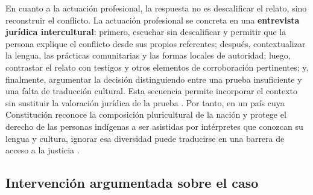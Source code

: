 \documentclass[
  spanish,
  letterpaper, oneside
]{article}
\begin{document}
En cuanto a la actuación profesional, la respuesta no es descalificar el relato,
sino reconstruir el conflicto. La actuación profesional se concreta en una \textbf{entrevista jurídica intercultural}: primero, escuchar sin descalificar y permitir que la persona explique el conflicto desde sus propios referentes; después, contextualizar la lengua, las prácticas comunitarias y las formas locales de autoridad; luego, contrastar el relato con testigos y otros elementos de corroboración pertinentes; y, finalmente, argumentar la decisión distinguiendo entre una prueba insuficiente y una falta de traducción cultural. Esta secuencia permite incorporar el contexto sin sustituir la valoración jurídica de la prueba \citep{scjn2022protocolo}.
Por tanto, en un país cuya Constitución reconoce la composición pluricultural de la
nación y protege el derecho de las personas indígenas a ser asistidas por
intérpretes que conozcan su lengua y cultura, ignorar esa diversidad puede traducirse
en una barrera de acceso a la justicia \citep{cpeum2026,leyDerechosLinguisticos2024}.

\subsection{Intervención argumentada sobre el caso}

\end{document}
